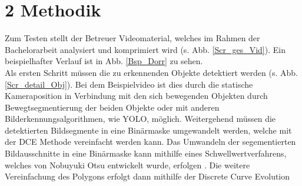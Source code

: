 \documentclass[a4paper,11pt,pdftex, parskip]{scrreprt}
\begin{document}
\section*{2 Methodik}{
Zum Testen stellt der Betreuer Videomaterial, welches im Rahmen der Bachelorarbeit analysiert und komprimiert wird (s. Abb. \ref{Scr_ges_Vid}). Ein beispielhafter Verlauf ist in Abb. \ref{Bsp_Dorr} zu sehen. \\
Als ersten Schritt müssen die zu erkennenden Objekte detektiert werden (s. Abb. \ref{Scr_detail_Obj}). Bei dem Beispielvideo ist dies durch die statische Kameraposition in Verbindung mit den sich bewegenden Objekten durch Bewegtsegmentierung der beiden Objekte oder mit anderen Bilderkennungsalgorithmen, wie YOLO, möglich.\newline
Weitergehend müssen die detektierten Bildsegmente in eine Binärmaske umgewandelt werden, welche mit der DCE Methode vereinfacht werden kann. \newline
Das Umwandeln der segementierten Bildausschnitte in eine Binärmaske kann mithilfe eines Schwellwertverfahrens, welches von Nobuyuki Otsu entwickelt wurde, erfolgen \citep{Otsu1979}. Die weitere Vereinfachung des Polygons erfolgt dann mithilfe der Discrete Curve Evolution \citep{Barkowsky2000}
 

}
\end{document}
